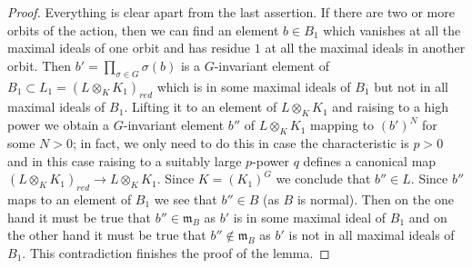 \documentclass[10pt,a4paper]{amsart}
\theoremstyle{plain}
\theoremstyle{definition}
\theoremstyle{remark}
\numberwithin{equation}{subsection}
\begin{document}
\begin{proof}
Everything is clear apart from the last assertion. If there are two or
more orbits of the action, then we can find an element $b \in B_1$
which vanishes at all the maximal ideals of one orbit and has residue
$1$ at all the maximal ideals in another orbit. Then
$b' = \prod_{\sigma \in G} \sigma(b)$ is a $G$-invariant element of
$B_1 \subset L_1 = (L \otimes_K K_1)_{red}$ which is in some maximal
ideals of $B_1$
but not in all maximal ideals of $B_1$. Lifting it to an element of
$L \otimes_K K_1$ and raising to a high power we obtain a $G$-invariant
element $b''$ of $L \otimes_K K_1$ mapping to $(b')^N$ for some $N > 0$;
in fact, we only need to do this in case the characteristic is $p > 0$ and
in this case raising to a suitably large $p$-power $q$ defines a
canonical map $(L \otimes_K K_1)_{red} \to L \otimes_K K_1$.
Since $K = (K_1)^G$ we conclude that $b'' \in L$. Since $b''$ maps
to an element of $B_1$ we see that $b'' \in B$ (as $B$ is normal).
Then on the one hand it must be true that $b'' \in \mathfrak m_B$
as $b'$ is in some maximal ideal of $B_1$ and on the other hand it
must be true that $b'' \not \in \mathfrak m_B$ as $b'$ is not in
all maximal ideals of $B_1$. This contradiction finishes the proof of the
lemma.
\end{proof}
\end{document}

